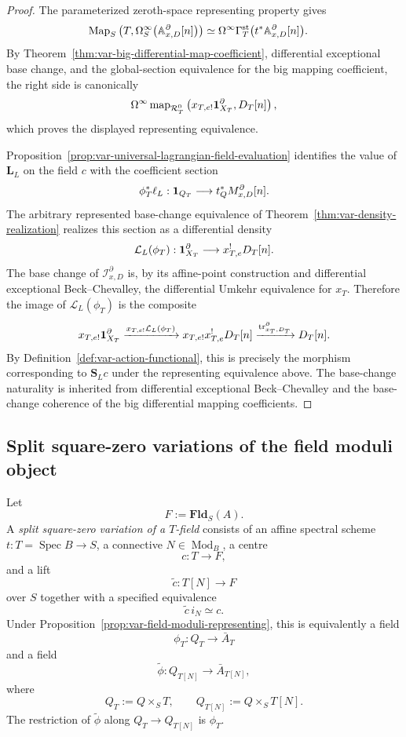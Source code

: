 \begin{proof}
The parameterized zeroth-space representing property gives
\[
\begin{aligned}
    \operatorname{Map}_S\left(
      T,
      \Omega_S^\infty\bigl(\mathbb A^\partial_{x,D}[n]\bigr)
    \right)
    &\simeq
    \Omega^\infty
    \Gamma_T^{\mathrm{st}}
    \bigl(t^*\mathbb A^\partial_{x,D}[n]\bigr).
\end{aligned}
\]
By Theorem~\ref{thm:var-big-differential-map-coefficient}, differential exceptional base change, and the global-section equivalence for the big mapping coefficient, the right side is canonically
\[
    \Omega^\infty
    \operatorname{map}_{\mathcal R_T^0}
    \left(
      x_{T,e!}\mathbf 1_{X_T}^\partial,
      D_T[n]
    \right),
\]
which proves the displayed representing equivalence.

Proposition~\ref{prop:var-universal-lagrangian-field-evaluation} identifies the value of \(\mathbf L_L\) on the field \(c\) with the coefficient section
\[
    \phi_T^*\ell_L:
    \mathbf 1_{Q_T}\longrightarrow t_Q^*M^\partial_{x,D}[n].
\]
The arbitrary represented base-change equivalence of Theorem~\ref{thm:var-density-realization} realizes this section as a differential density
\[
    \mathcal L_L(\phi_T):
    \mathbf 1_{X_T}^\partial\longrightarrow x_{T,e}^!D_T[n].
\]
The base change of \(\mathcal I^\partial_{x,D}\) is, by its affine-point construction and differential exceptional Beck--Chevalley, the differential Umkehr equivalence for \(x_T\). Therefore the image of \(\mathcal L_L(\phi_T)\) is the composite
\[
    x_{T,e!}\mathbf 1_{X_T}^\partial
    \xrightarrow{x_{T,e!}\mathcal L_L(\phi_T)}
    x_{T,e!}x_{T,e}^!D_T[n]
    \xrightarrow{\operatorname{tr}^\partial_{x_T,D_T}}
    D_T[n].
\]
By Definition~\ref{def:var-action-functional}, this is precisely the morphism corresponding to \(\mathbf S_Lc\) under the representing equivalence above. The base-change naturality is inherited from differential exceptional Beck--Chevalley and the base-change coherence of the big differential mapping coefficients.
\end{proof}

\subsection{Split square-zero variations of the field moduli object}

\begin{definition}
\label{def:var-field-variation-family}
Let
\[
    F:=\mathbf{Fld}_S(A).
\]
A \emph{split square-zero variation of a \(T\)-field} consists of an affine spectral scheme \(t:T=\operatorname{Spec}B\to S\), a connective \(N\in\operatorname{Mod}_B\), a centre
\[
    c:T\longrightarrow F,
\]
and a lift
\[
    \widetilde c:T[N]\longrightarrow F
\]
over \(S\) together with a specified equivalence
\[
    \widetilde c\,i_N\simeq c.
\]
Under Proposition~\ref{prop:var-field-moduli-representing}, this is equivalently a field
\[
    \phi_T:Q_T\to\bar A_T
\]
and a field
\[
    \widetilde\phi:
    Q_{T[N]}\to\bar A_{T[N]},
\]
where
\[
    Q_T:=Q\times_ST,
    \qquad
    Q_{T[N]}:=Q\times_ST[N].
\]
The restriction of \(\widetilde\phi\) along \(Q_T\to Q_{T[N]}\) is \(\phi_T\).
\end{definition}

